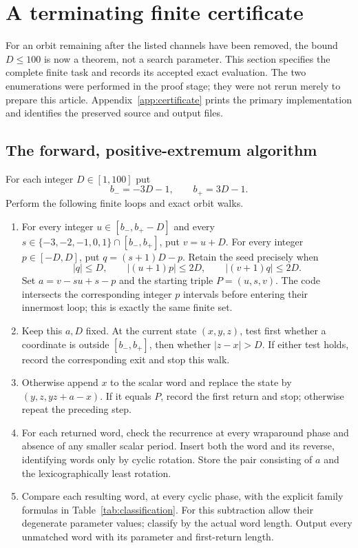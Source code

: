 \section{A terminating finite certificate}
\label{sec:finite}

For an orbit remaining after the listed channels have been removed,
the bound $D\le100$ is now a theorem, not a search parameter.
This section specifies the complete finite task and records its
accepted exact evaluation. The two enumerations were performed in
the proof stage; they were not rerun merely to prepare this article.
Appendix~\ref{app:certificate} prints the primary implementation
and identifies the preserved source and output files.

\subsection{The forward, positive-extremum algorithm}
For each integer $D\in[1,100]$ put
\[
 b_-=-3D-1,\qquad b_+=3D-1.
\]
Perform the following finite loops and exact orbit walks.
\begin{enumerate}
\item For every integer $u\in[b_-,b_+-D]$ and every
$s\in\{-3,-2,-1,0,1\}\cap[b_-,b_+]$, put $v=u+D$.
For every integer $p\in[-D,D]$, put $q=(s+1)D-p$.
Retain the seed precisely when
\begin{equation}
 |q|\le D,\qquad |(u+1)p|\le2D,\qquad
 |(v+1)q|\le2D.
 \label{eq:seedbounds}
\end{equation}
Set $a=v-su+s-p$ and the starting triple $P=(u,s,v)$.
The code intersects the corresponding integer $p$ intervals
before entering their innermost loop; this is exactly the same
finite set.
\item Keep this $a,D$ fixed. At the current state $(x,y,z)$,
test first whether a coordinate is outside $[b_-,b_+]$,
then whether $|z-x|>D$. If either test holds, record the
corresponding exit and stop this walk.
\item Otherwise append $x$ to the scalar word and replace the
state by $(y,z,yz+a-x)$. If it equals $P$, record the first
return and stop; otherwise repeat the preceding step.
\item For each returned word, check the recurrence at every
wraparound phase and absence of any smaller scalar period.
Insert both the word and its reverse, identifying words only
by cyclic rotation. Store the pair consisting of $a$ and the
lexicographically least rotation.
\item Compare each resulting word, at every cyclic phase, with
the explicit family formulas in Table~\ref{tab:classification}.
For this subtraction allow their degenerate parameter values;
classify by the actual word length. Output every unmatched word
with its parameter and first-return length.
\end{enumerate}

